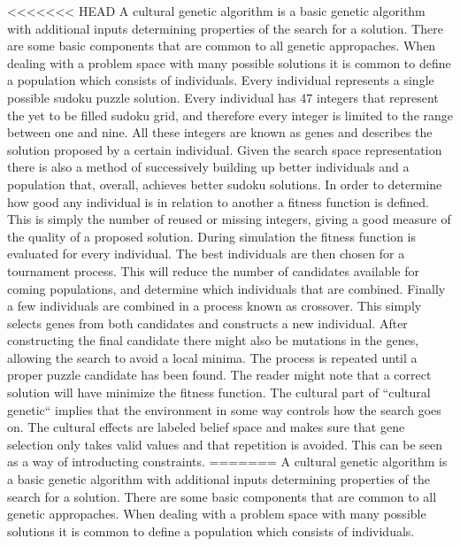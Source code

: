 \documentclass[a4paper,11pt]{kth-mag}
\begin{document}
<<<<<<< HEAD
A cultural genetic algorithm is a basic genetic algorithm with additional inputs determining properties of the search for a solution. There are some basic components that are common to all genetic appropaches.
\newline
When dealing with a problem space with many possible solutions it is common to define a population which consists of individuals. Every individual represents a single possible sudoku puzzle solution. \cite{stochastic} Every individual has 47 integers that represent the yet to be filled sudoku grid, and therefore every integer is limited to the range between one and nine. All these integers are known as genes and describes the solution proposed by a certain individual.
\newline
Given the search space representation there is also a method of successively building up better individuals and a population that, overall, achieves better sudoku solutions. In order to determine how good any individual is in relation to another a fitness function is defined. This is simply the number of reused or missing integers, giving a good measure of the quality of a proposed solution. During simulation the fitness function is evaluated for every individual. The best individuals are then chosen for a tournament process. This will reduce the number of candidates available for coming populations, and determine which individuals that are combined. Finally a few individuals are combined in a process known as crossover. This simply selects genes from both candidates and constructs a new individual. After constructing the final candidate there might also be mutations in the genes, allowing the search to avoid a local minima. The process is repeated until a proper puzzle candidate has been found. The reader might note that a correct solution will have minimize the fitness function.
\newline
The cultural part of ``cultural genetic`` implies that the environment in some way controls how the search goes on. The cultural effects are labeled belief space and makes sure that gene selection only takes valid values and that repetition is avoided. This can be seen as a way of introducting constraints.
=======
A cultural genetic algorithm is a basic genetic algorithm with additional inputs determining properties of the search for a solution.
 There are some basic components that are common to all genetic appropaches. \newline
When dealing with a problem space with many possible solutions it is common to define a population which consists of individuals.
\end{document}
